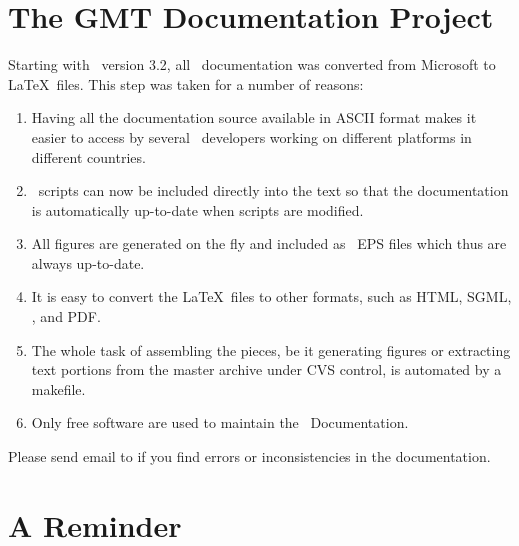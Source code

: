 
\chapter*{The GMT Documentation Project}

Starting with \GMT\ version 3.2, all \GMT\ documentation was
converted from Microsoft  to \LaTeX\ files.
This step was taken for a number of reasons:

\begin{enumerate}

\item Having all the documentation source available in
ASCII format makes it easier to access by several
\GMT\ developers working on different platforms in 
different countries.

\item \GMT\ scripts can now be included directly into the text
so that the documentation is automatically up-to-date
when scripts are modified.

\item All figures are generated on the fly and included as
\GMT\ EPS files which thus are always up-to-date.

\item It is easy to convert the \LaTeX\ files to other
formats, such as HTML, SGML, \PS, and PDF.

\item The whole task of assembling the pieces, be it generating
figures or extracting text portions from the master archive under
CVS control, is automated by a makefile.

\item Only free software are used to maintain the \GMT\ Documentation.

\end{enumerate}

Please send email to
if you find errors or inconsistencies in the documentation.

\chapter*{A Reminder}

